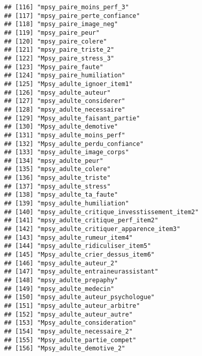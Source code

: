 \documentclass[
]{article}
\begin{document}
\begin{verbatim}
## [116] "mpsy_paire_moins_perf_3"                             
## [117] "mpsy_paire_perte_confiance"                          
## [118] "mpsy_paire_image_neg"                                
## [119] "mpsy_paire_peur"                                     
## [120] "mpsy_paire_colere"                                   
## [121] "mpsy_paire_triste_2"                                 
## [122] "Mpsy_paire_stress_3"                                 
## [123] "Mpsy_paire_faute"                                    
## [124] "mpsy_paire_humiliation"                              
## [125] "Mpsy_adulte_ignoer_item1"                            
## [126] "mpsy_adulte_auteur"                                  
## [127] "mpsy_adulte_considerer"                              
## [128] "mpsy_adulte_necessaire"                              
## [129] "Mpsy_adulte_faisant_partie"                          
## [130] "Mpsy_adulte_demotive"                                
## [131] "mpsy_adulte_moins_perf"                              
## [132] "Mpsy_adulte_perdu_confiance"                         
## [133] "mpsy_adulte_image_corps"                             
## [134] "mpsy_adulte_peur"                                    
## [135] "mpsy_adulte_colere"                                  
## [136] "mpsy_adulte_triste"                                  
## [137] "mpsy_adulte_stress"                                  
## [138] "mpsy_adulte_ta_faute"                                
## [139] "mpsy_adulte_humiliation"                             
## [140] "mpsy_adulte_critique_invesstissement_item2"          
## [141] "mpsy_adulte_critique_perf_item2"                     
## [142] "mpsy_adulte_critiquer_apparence_item3"               
## [143] "mpsy_adulte_rumeur_item4"                            
## [144] "mpsy_adulte_ridiculiser_item5"                       
## [145] "Mpsy_adulte_crier_dessus_item6"                      
## [146] "mpsy_adulte_auteur_2"                                
## [147] "mpsy_adulte_entraineurassistant"                     
## [148] "mpsy_adulte_prepaphy"                                
## [149] "mpsy_adulte_medecin"                                 
## [150] "mpsy_adulte_auteur_psychologue"                      
## [151] "mpsy_adulte_auteur_arbitre"                          
## [152] "mpsy_adulte_auteur_autre"                            
## [153] "Mpsy_adulte_consideration"                           
## [154] "mpsy_adulte_necessaire_2"                            
## [155] "Mpsy_adulte_partie_compet"                           
## [156] "Mpsy_adulte_demotive_2"                              

\end{verbatim}
\end{document}
